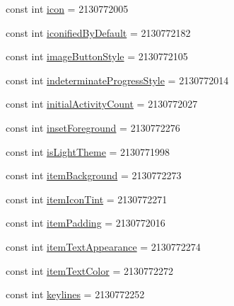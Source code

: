 \begin{DoxyCompactItemize}
\item 
const int \mbox{\hyperlink{class_f_w_p_s___app_1_1_droid_1_1_resource_1_1_attribute_a0467a5db6e427d682b5a41c689e220a3}{icon}} = 2130772005
\item 
const int \mbox{\hyperlink{class_f_w_p_s___app_1_1_droid_1_1_resource_1_1_attribute_ab63b884412f9af850e3388fe75b3ccfa}{iconified\+By\+Default}} = 2130772182
\item 
const int \mbox{\hyperlink{class_f_w_p_s___app_1_1_droid_1_1_resource_1_1_attribute_ac65a8d52d96465d96a73af4bdc846c27}{image\+Button\+Style}} = 2130772105
\item 
const int \mbox{\hyperlink{class_f_w_p_s___app_1_1_droid_1_1_resource_1_1_attribute_a106fdc62b264130d8f8709bf3e084d7e}{indeterminate\+Progress\+Style}} = 2130772014
\item 
const int \mbox{\hyperlink{class_f_w_p_s___app_1_1_droid_1_1_resource_1_1_attribute_ac4ec9cba61e0a9e81b436acc9e0c94b0}{initial\+Activity\+Count}} = 2130772027
\item 
const int \mbox{\hyperlink{class_f_w_p_s___app_1_1_droid_1_1_resource_1_1_attribute_a2cd8a00020861dab9a59b26c5b9a0af5}{inset\+Foreground}} = 2130772276
\item 
const int \mbox{\hyperlink{class_f_w_p_s___app_1_1_droid_1_1_resource_1_1_attribute_a36ac2dc295c85b0f46e8b277ec179c4d}{is\+Light\+Theme}} = 2130771998
\item 
const int \mbox{\hyperlink{class_f_w_p_s___app_1_1_droid_1_1_resource_1_1_attribute_ad4e42d78a41ef8f28bfa6310882eb58c}{item\+Background}} = 2130772273
\item 
const int \mbox{\hyperlink{class_f_w_p_s___app_1_1_droid_1_1_resource_1_1_attribute_aaedce1f5fd72c1d29a3c0f271127e8d0}{item\+Icon\+Tint}} = 2130772271
\item 
const int \mbox{\hyperlink{class_f_w_p_s___app_1_1_droid_1_1_resource_1_1_attribute_ae0b712523a2834db001df47538353ee8}{item\+Padding}} = 2130772016
\item 
const int \mbox{\hyperlink{class_f_w_p_s___app_1_1_droid_1_1_resource_1_1_attribute_a066231af5fd1862b1e6cf57ee6b9bf00}{item\+Text\+Appearance}} = 2130772274
\item 
const int \mbox{\hyperlink{class_f_w_p_s___app_1_1_droid_1_1_resource_1_1_attribute_ac9d608a220a8bf11d52ca64aa09f6472}{item\+Text\+Color}} = 2130772272
\item 
const int \mbox{\hyperlink{class_f_w_p_s___app_1_1_droid_1_1_resource_1_1_attribute_aae5636f69d4ff615a92fe1ded3437889}{keylines}} = 2130772252
\item 

\end{DoxyCompactItemize}
